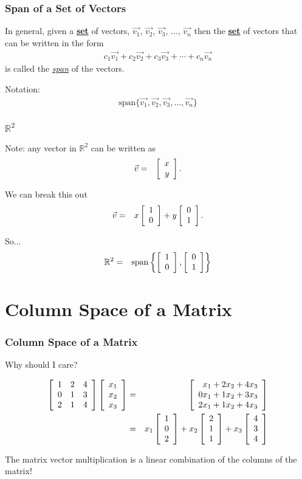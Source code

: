 \begin{frame}
  \frametitle{Span of a Set of Vectors}

  In general, given a \textbf{\underline{set}} of vectors, $\vec{v_1}$, $\vec{v_2}$, $\vec{v_3}$,
  $\ldots$, $\vec{v_n}$ then the \textbf{\underline{set}} of vectors
  that can be written in the form
  \begin{eqnarray*}
    c_1 \vec{v_1} + c_2 \vec{v_2} + c_3 \vec{v_3} + \cdots + c_n \vec{v_n}
  \end{eqnarray*}
  is called the \textit{\underline{span}} of the vectors.

  {
    Notation:
    \begin{eqnarray*}
      \mathrm{span}\{\vec{v_1}, \vec{v_2}, \vec{v_3},\ldots, \vec{v_n} \}
    \end{eqnarray*}
  }

\end{frame}


\begin{frame}
  \frametitle{$\mathbb{R}^2$}

  Note: any vector in $\mathbb{R}^2$ can be written as 
  \begin{eqnarray*}
    \vec{v} & = & \left[ \begin{array}{r} x \\ y \end{array} \right].
  \end{eqnarray*}

  We can break this out
  \begin{eqnarray*}
    \vec{v} & = & x \left[ \begin{array}{r} 1 \\ 0 \end{array} \right] + y \left[ \begin{array}{r} 0 \\ 1 \end{array} \right].
  \end{eqnarray*}

  So... 
  \begin{eqnarray*}
    \mathbb{R}^2 & = & \mathrm{span}\left\{\left[ \begin{array}{r} 1 \\ 0 \end{array} \right],\left[ \begin{array}{r} 0 \\ 1 \end{array} \right]\right\}
  \end{eqnarray*}
 


\end{frame}


\section{Column Space of a Matrix}

\begin{frame}
  \frametitle{Column Space of a Matrix}

  Why should I care?

  \begin{eqnarray*}
    \left[ \begin{array}{rrr} 1 & 2 & 4 \\ 0 & 1 & 3 \\ 2 & 1 & 4 \end{array} \right] \left[ \begin{array}{r} x_1 \\ x_2 \\ x_3 \end{array} \right] &
    = & 
    \left[ \begin{array}{r} x_1+2x_2+4x_3 \\ 0x_1+1 x_2+3x_3 \\ 2x_1+1 x_2+4 x_3 \end{array} \right] \\
    & = & x_1 \left[ \begin{array}{r} 1 \\ 0 \\ 2 \end{array} \right] + x_2 \left[ \begin{array}{r} 2 \\ 1 \\ 1 \end{array} \right] + x_3 \left[ \begin{array}{r} 4 \\ 3 \\ 4 \end{array} \right]
  \end{eqnarray*}

  The matrix vector multiplication is a linear combination of the
  columns of the matrix!

\end{frame}


